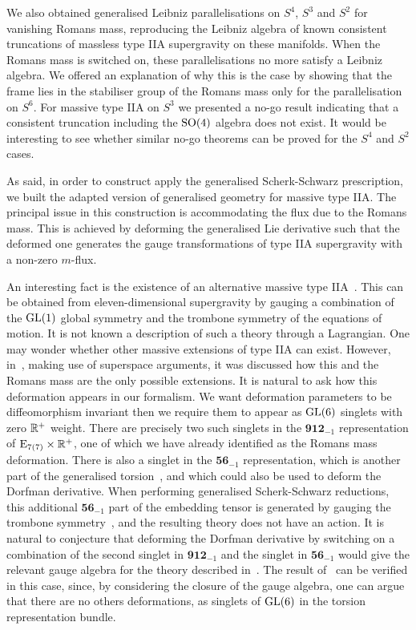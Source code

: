 \documentclass[debug]{phd}
\begin{document}
		We also obtained generalised Leibniz parallelisations on $S^4$, $S^3$ and $S^2$ for vanishing Romans mass, reproducing the Leibniz algebra of known consistent truncations of massless type IIA supergravity on these manifolds. 
		When the Romans mass is switched on, these parallelisations no more satisfy a Leibniz algebra. 
		We offered an explanation of why this is the case by showing that the frame lies in the stabiliser group of the Romans mass only for the parallelisation on $S^6$. 
		For massive type IIA on $S^3$ we presented a no-go result indicating that a consistent truncation including the $\mathrm{SO}(4)$ algebra does not exist. 
		It would be interesting to see whether similar no-go theorems can be proved for the $S^4$ and $S^2$ cases.
		
		As said, in order to construct apply the generalised Scherk-Schwarz prescription, we built the adapted version of generalised geometry for massive type IIA. 
		The principal issue in this construction is accommodating the flux due to the Romans mass. 
		This is achieved by deforming the generalised Lie derivative such that the deformed one generates the gauge transformations of type IIA supergravity with a non-zero $m$-flux.

		An interesting fact is the existence of an alternative massive type IIA~\cite{Howe:1997qt}. 
		This can be obtained from eleven-dimensional supergravity by gauging a combination of the $\mathrm{GL}(1)$ global symmetry and the trombone symmetry of the equations of motion.
		It is not known a description of such a theory through a Lagrangian.
		One may wonder whether other massive extensions of type IIA can exist.
		However, in~\cite{Tsimpis:2005vu}, making use of superspace arguments, it was discussed how this and the Romans mass are the only possible extensions.
		It is natural to ask how this deformation appears in our formalism.
		We want deformation parameters to be diffeomorphism invariant then we require them to appear as $\mathrm{GL}(6)$ singlets with zero $\mathbb{R}^+$ weight. 
		There are precisely two such singlets in the $\mathbf{912}_{-1}$ representation of $\mathrm{E}_{7(7)}\times\mathbb{R}^+$, one of which we have already identified as the Romans mass deformation.
		There is also a singlet in the $\mathbf{56}_{-1}$ representation, which is another part of the generalised torsion~\cite{Coimbra:2011ky}, and which could also be used to deform the Dorfman derivative. 
		When performing generalised Scherk-Schwarz reductions, this additional $\mathbf{56}_{-1}$ part of the embedding tensor is generated by gauging the trombone symmetry~\cite{LeDiffon:2008sh}, and the resulting theory does not have an action. 
		It is natural to conjecture that deforming the Dorfman derivative by switching on a combination of the second singlet in $\mathbf{912}_{-1}$ and the singlet in $\mathbf{56}_{-1}$ would give the relevant gauge algebra for the theory described in~\cite{Howe:1997qt}.
		The result of~\cite{Tsimpis:2005vu} can be verified in this case, since, by considering the closure of the gauge algebra, one can argue that there are no others deformations, as singlets of $\mathrm{GL}(6)$ in the torsion representation bundle.
		
\end{document}
